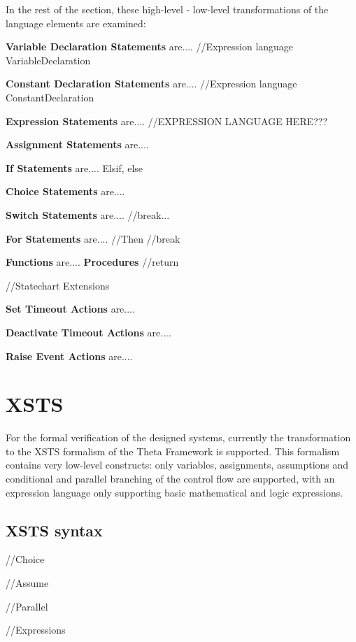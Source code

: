 In the rest of the section, these high-level - low-level transformations of the language elements are examined:

\textbf{Variable Declaration Statements} are....
//Expression language VariableDeclaration

\textbf{Constant Declaration Statements} are....
//Expression language ConstantDeclaration

\textbf{Expression Statements} are....
//EXPRESSION LANGUAGE HERE???

\textbf{Assignment Statements} are....

\textbf{If Statements} are....
Elsif, else

\textbf{Choice Statements} are....

\textbf{Switch Statements} are....
//break...

\textbf{For Statements} are....
//Then
//break

\textbf{Functions} are....
\textbf{Procedures}
//return

//Statechart Extensions

\textbf{Set Timeout Actions} are....

\textbf{Deactivate Timeout Actions} are....

\textbf{Raise Event Actions} are....

\section{XSTS} \label{section_tr_xsts}
For the formal verification of the designed systems, currently the transformation to the XSTS formalism of the Theta Framework is supported. This formalism contains very low-level constructs: only variables, assignments, assumptions and conditional and parallel branching of the control flow are supported, with an expression language only supporting basic mathematical and logic expressions. 

\subsection{XSTS syntax}
//Choice

//Assume

//Parallel

//Expressions

